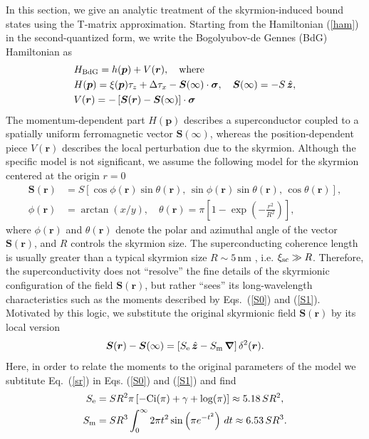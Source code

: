 \documentclass[twocolumn,showpacs,floatfix,nofootinbib,longbibliography]{revtex4-1}
\begin{document}
In this section, we give an analytic treatment of the skyrmion-induced bound states using the T-matrix approximation. Starting from the Hamiltonian (\ref{ham}) in the second-quantized form, we write the Bogolyubov-de Gennes (BdG) Hamiltonian as 
\begin{align}
	& H_{\rm BdG} = h(\bm p) + V(\bm r),\quad {\rm where}  \label{hbdg} \\
& H(\bm p) = \xi(\bm p)\tau_z+\Delta \tau_x - \bm S(\infty)\cdot\bm\sigma,\quad \bm S(\infty) = -S\,\hat{\bm z}, \nonumber\\
& V(\bm r) = -\left[ \bm S(\bm r)-\bm S(\infty)\right]\cdot\bm\sigma \label{v0}
\end{align}
The momentum-dependent part $H(\bm p)$ describes a superconductor coupled to a spatially uniform ferromagnetic vector $\bm S(\infty)$, whereas the position-dependent piece $V(\bm r)$ describes the local perturbation due to the skyrmion. Although the specific model is not significant, we assume the following model for the skyrmion centered at the origin $r=0$
\begin{align}
	\bm S(\bm r) &= S\left[ \cos\phi(\bm r) \sin\theta(\bm r),\, \sin\phi(\bm r)\sin\theta(\bm r),\,\cos\theta(\bm r)\right], \nonumber \\   
	\phi(\bm r) &= \arctan(x/y),\quad \theta(\bm r) = \pi \left[ 1-\exp\left( -\frac{r^2}{R^2} \right) \right], 	\label{sr}
\end{align}
where $\phi(\bm r)$ and $\theta(\bm r)$ denote the polar and azimuthal angle of the vector $\bm S(\bm r)$, and $R$ controls the skyrmion size. The superconducting coherence length is usually greater than a typical skyrmion size $R\sim 5$\,nm \cite{Heinze2011,Romming2013,Bergmann2014,Brede2014,Sonntag2014,vonBergmann2015,Romming2015}, i.e. $\xi_{\rm sc}\gg R$. Therefore, the superconductivity does not ``resolve'' the fine details of the skyrmionic configuration of the field  $\bm S(\bm r)$, but rather ``sees'' its long-wavelength characteristics such as the moments described by Eqs.~(\ref{S0}) and (\ref{S1}). Motivated by this logic, we substitute the original skyrmionic field $\bm S(\bm r)$ by its local version 
\begin{equation}
	\bm S(\bm r) - \bm S(\infty) = \left[ S_{\rm e}\, \hat{\bm z} - S_{\rm m}\, \bm \nabla\right] \delta^2(\bm r).
	\label{S}
\end{equation}
Here, in order to relate the moments to the original parameters of the model we subtitute Eq.~(\ref{sr}) in Eqs. (\ref{S0}) and (\ref{S1}) and find 
\begin{align}
	S_{\rm e} &= SR^2 \pi  \left [-\text{Ci}(\pi )+\gamma +\log (\pi )\right] \approx 5.18\, SR^2, \\
	S_{\rm m} &= SR^3 \int_0^{\infty } 2 \pi  t^2 \sin \left(\pi  e^{-t^2}\right) \, dt \approx 6.53\, SR^3.
\end{align}
\end{document}
